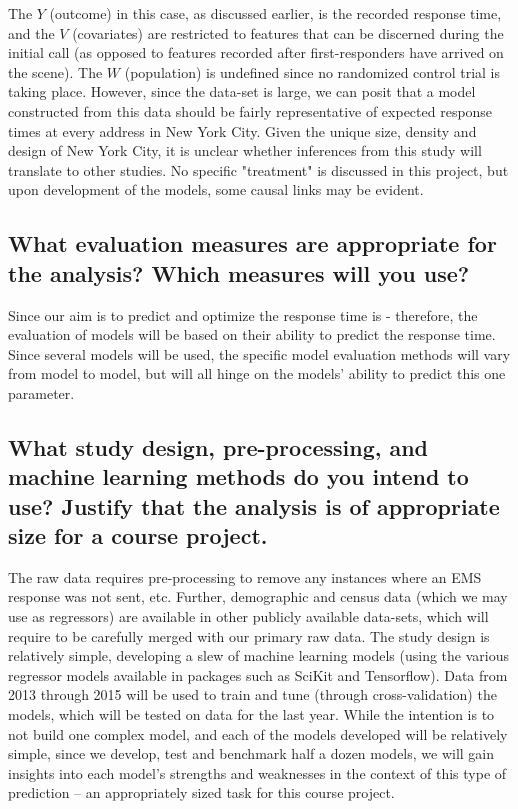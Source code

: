 \documentclass[twoside,11pt]{article}
\begin{document}
The $Y$ (outcome) in this case, as discussed earlier, is the recorded response time, and the $V$ (covariates) are restricted to features that can be discerned during the initial call (as opposed to features recorded after first-responders have arrived on the scene). The $W$ (population) is undefined since no randomized control trial is taking place. However, since the data-set is large, we can posit that a model constructed from this data should be fairly representative of expected response times at every address in New York City. Given the unique size, density and design of New York City, it is unclear whether inferences from this study will translate to other studies. No specific "treatment" is discussed in this project, but upon development of the models, some causal links may be evident.

\subsection{What evaluation measures are appropriate for the analysis? Which measures will you use?}

Since our aim is to predict and optimize the response time is - therefore, the evaluation of models will be based on their ability to predict the response time. Since several models will be used, the specific model evaluation methods will vary from model to model, but will all hinge on the models' ability to predict this one parameter.

\subsection{What study design, pre-processing, and machine learning methods do you intend to use? Justify that the analysis is of appropriate size for a course project.}

The raw data requires pre-processing to remove any instances where an EMS response was not sent, etc. Further, demographic and census data (which we may use as regressors) are available in other publicly available data-sets, which will require to be carefully merged with our primary raw data. The study design is relatively simple, developing a slew of machine learning models (using the various regressor models available in packages such as SciKit and Tensorflow). Data from 2013 through 2015 will be used to train and tune (through cross-validation) the models, which will be tested on data for the last year. While the intention is to not build one complex model, and each of the models developed will be relatively simple, since we develop, test and benchmark half a dozen models, we will gain insights into each model's strengths and weaknesses in the context of this type of prediction -- an appropriately sized task for this course project. 
\end{document}
